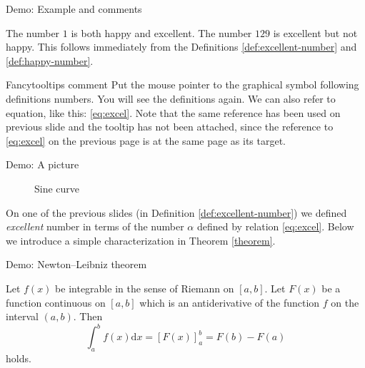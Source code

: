 \documentclass[envcountsect,t,10pt]{beamer}
\def\dx{{\mathrm d}x}
\begin{document}
\begin{frame}{Demo: Example and comments}
\begin{example}
  The number $1$ is both happy and excellent. The number $129$ is
  excellent but not happy. This follows immediately from the
  Definitions \ref{def:excellent-number} and \ref{def:happy-number}.
\end{example}
\begin{alertblock}{Fancytooltips comment}
  Put the mouse pointer to the graphical symbol following definitions
  numbers. You will see the definitions again. We can also refer to
  equation, like this: \eqref{eq:excel}. Note that the same reference
  has been used on previous slide and the tooltip has not been
  attached, since the reference to \eqref{eq:excel} on the previous
  page is at the same page as its target.
\end{alertblock}
\end{frame}


\begin{frame}{Demo: A picture}
  \begin{figure}
    \centering
{}
    \caption{Sine curve}
    \label{pic:sine}
  \end{figure}

  On one of the previous slides (in Definition \ref{def:excellent-number}) 
  we defined \textit{excellent} number in terms of the number $\alpha$
  defined by relation \eqref{eq:excel}. Below we introduce a simple
  characterization in Theorem \ref{theorem}.
\end{frame}

\begin{frame}{Demo: Newton--Leibniz theorem}
  
  \begin{theorem}
    Let $f(x)$ be integrable in the sense of Riemann on $[a,b]$. Let
    $F(x)$ be a function continuous on $[a,b]$ which is an
    antiderivative of the function $f$ on the interval $(a,b)$. Then
    \begin{equation*}
      \int_a^bf(x)\dx=[F(x)]_a^b=F(b)-F(a)
    \end{equation*}
    holds.\label{th:NL}
  \end{theorem}
\end{frame}
\end{document}
